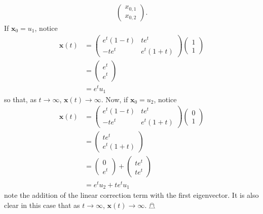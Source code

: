 \documentclass{article}
\begin{document}
\begin{itemize}
\begin{itemize}
\begin{align*}
\begin{pmatrix}
                x_{0,1}\\
                x_{0,2}
            \end{pmatrix}.
        \end{align*}
        If $\mathbf{x}_0 = u_1$, notice
        \begin{align*}
            \mathbf{x}(t) &= \begin{pmatrix}
                e^t(1 - t) & te^t\\
                -te^t & e^t(1 + t)
            \end{pmatrix}\begin{pmatrix}
                1\\
                1
            \end{pmatrix}\\
            &= \begin{pmatrix}
                e^t\\
                e^t
            \end{pmatrix}\\
            &= e^tu_1
        \end{align*}
        so that, as $t \to \infty$, $\mathbf{x}(t) \to \infty$. Now, if $\mathbf{x}_0 = u_2$, notice
        \begin{align*}
            \mathbf{x}(t) &= \begin{pmatrix}
                e^t(1 - t) & te^t\\
                -te^t & e^t(1 + t)
            \end{pmatrix}\begin{pmatrix}
                0\\
                1
            \end{pmatrix}\\
            &= \begin{pmatrix}
                te^t\\
                e^t(1 + t)
            \end{pmatrix}\\
            &= \begin{pmatrix}
                0\\
                e^t
            \end{pmatrix} + \begin{pmatrix}
                te^t\\
                te^t
            \end{pmatrix}\\
            &= e^tu_2 + te^tu_1
        \end{align*}
        note the addition of the linear correction term with the first eigenvector. It is also clear in this case that as $t \to \infty$, $\mathbf{x}(t) \to \infty$. 
        \hfill $\mathghost$
    \end{itemize}
\end{itemize}
\end{document}

